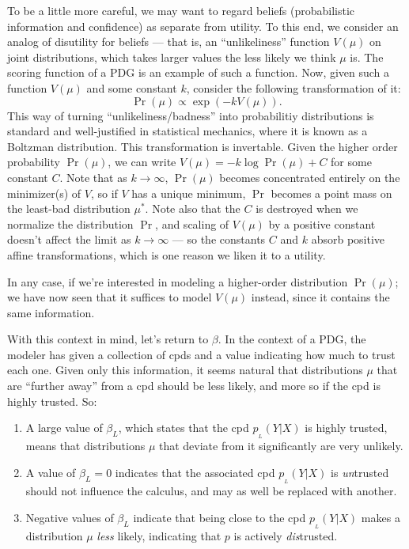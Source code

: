 \documentclass[twoside]{article} %
\theoremstyle{plain}
\theoremstyle{definition}
\newcommand{\ssub}[1]{_{\!_{#1}\!}}
\begin{document}
    To be a little more careful, we may want to regard beliefs (probabilistic information and confidence) as separate from utility.  
    To this end, we consider an analog of disutility for beliefs --- that is, an ``unlikeliness'' function $V(\mu)$ on joint distributions, which takes larger values the less likely we think $\mu$ is. The scoring function of a PDG is an example of such a function. 
    Now, given such a function $V(\mu)$ and some constant $k$, consider the following transformation of it:
    \[ \Pr(\mu) \propto \exp( -k V(\mu)).\]
    This way of turning ``unlikeliness/badness'' into probabilitiy distributions is standard and well-justified in statistical mechanics, where it is known as a Boltzman distribution.
    This transformation is invertable. Given the higher order probability $\Pr(\mu)$, we can write $V(\mu) = - k \log \Pr(\mu) + C$ for some constant $C$.  Note that as $k \to \infty$, $\Pr(\mu)$ becomes concentrated entirely on the minimizer(s) of $V$, so if $V$ has a unique minimum, $\Pr$ becomes a point mass on the least-bad distribution $\mu^*$. Note also that the $C$ is destroyed when we normalize the distribution $\Pr$, and scaling of $V(\mu)$ by a positive constant doesn't affect the limit as $k \to \infty$ --- so the constants $C$ and $k$ absorb positive affine transformations, which is one reason we liken it to a utility.
    
    In any case, if we're interested in modeling a higher-order distribution $\Pr(\mu)$; we have now seen that it suffices to model $V(\mu)$ instead, since it contains the same information. 
        
    With this context in mind, let's return to $\beta$.  
    In the context of a PDG, the modeler has given a collection of cpds and a value indicating how much to trust each one. 
    Given only this information, it seems natural that distributions $\mu$ that are ``further away'' from a cpd should be less likely, and more so if the cpd is highly trusted. So:
    \begin{enumerate}
        \item A large value of $\beta_L$, which states that the cpd $p \ssub L(Y|X)$ is highly trusted, means that distributions $\mu$ that deviate from it significantly are very unlikely. 
        \item A value of $\beta_L = 0$ indicates that the associated cpd $p\ssub L(Y|X)$ is \emph{un}trusted should not influence the calculus, and may as well be replaced with another. 
        \item Negative values of $\beta_L$ indicate that being close to the cpd $p\ssub L(Y|X)$ makes a distribution $\mu$ \emph{less} likely, indicating that $p$ is actively \emph{dis}trusted.
    \end{enumerate}
    
\end{document}
